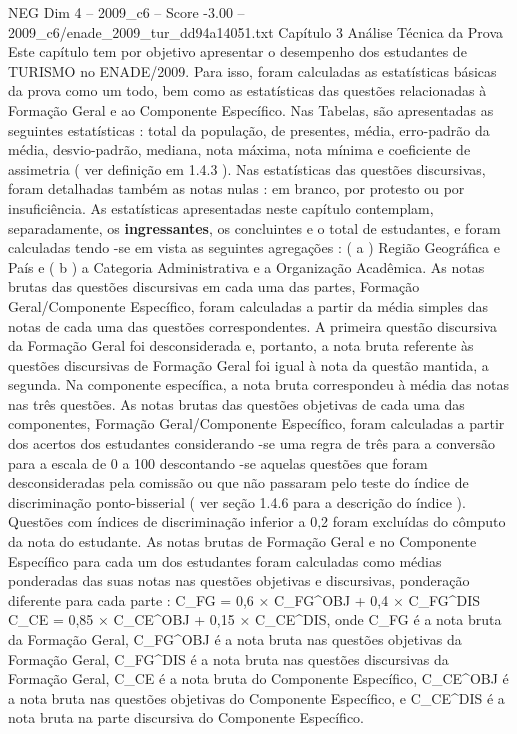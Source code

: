 \begin{textsample}{NEG Dim 4 – 2009\_c6 – Score -3.00 – 2009\_c6/enade\_2009\_tur\_dd94a14051.txt}  \label{ex:f4_neg_039}
Capítulo 3 Análise Técnica da Prova Este capítulo tem por objetivo apresentar o desempenho dos estudantes de TURISMO no ENADE/2009.
Para isso, foram calculadas as estatísticas básicas da prova como um todo, bem como as estatísticas das questões relacionadas à Formação Geral e ao Componente Específico.
Nas Tabelas, são apresentadas as seguintes estatísticas : total da população, de presentes, média, erro-padrão da média, desvio-padrão, mediana, nota máxima, nota mínima e coeficiente de assimetria ( ver definição em 1.4.3 ).
Nas estatísticas das questões discursivas, foram detalhadas também as notas nulas : em branco, por protesto ou por insuficiência.
As estatísticas apresentadas neste capítulo contemplam, separadamente, os \textbf{ingressantes}, os concluintes e o total de estudantes, e foram calculadas tendo -se em vista as seguintes agregações : ( a ) Região Geográfica e País e ( b ) a Categoria Administrativa e a Organização Acadêmica.
As notas brutas das questões discursivas em cada uma das partes, Formação Geral/Componente Específico, foram calculadas a partir da média simples das notas de cada uma das questões correspondentes.
A primeira questão discursiva da Formação Geral foi desconsiderada e, portanto, a nota bruta referente às questões discursivas de Formação Geral foi igual à nota da questão mantida, a segunda.
Na componente específica, a nota bruta correspondeu à média das notas nas três questões.
As notas brutas das questões objetivas de cada uma das componentes, Formação Geral/Componente Específico, foram calculadas a partir dos acertos dos estudantes considerando -se uma regra de três para a conversão para a escala de 0 a 100 descontando -se aquelas questões que foram desconsideradas pela comissão ou que não passaram pelo teste do índice de discriminação ponto-bisserial ( ver seção 1.4.6 para a descrição do índice ).
Questões com índices de discriminação inferior a 0,2 foram excluídas do cômputo da nota do estudante.
As notas brutas de Formação Geral e no Componente Específico para cada um dos estudantes foram calculadas como médias ponderadas das suas notas nas questões objetivas e discursivas, ponderação diferente para cada parte : C\_FG = 0,6 × C\_FG\textasciicircum{}OBJ + 0,4 × C\_FG\textasciicircum{}DIS C\_CE = 0,85 × C\_CE\textasciicircum{}OBJ + 0,15 × C\_CE\textasciicircum{}DIS, onde C\_FG é a nota bruta da Formação Geral, C\_FG\textasciicircum{}OBJ é a nota bruta nas questões objetivas da Formação Geral, C\_FG\textasciicircum{}DIS é a nota bruta nas questões discursivas da Formação Geral, C\_CE é a nota bruta do Componente Específico, C\_CE\textasciicircum{}OBJ é a nota bruta nas questões objetivas do Componente Específico, e C\_CE\textasciicircum{}DIS é a nota bruta na parte discursiva do Componente Específico.

\end{textsample}

